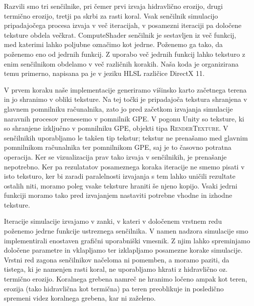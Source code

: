 \documentclass[9pt]{pnas-new}
\begin{document}
Razvili smo tri senčilnike, pri čemer prvi izvaja hidravlično erozijo, drugi termično erozijo, tretji pa skrbi za rasti koral. Vsak senčilnik simulacijo pripadajočega procesa izvaja v več iteracijah, v posamezni iteraciji pa določene teksture obdela večkrat. ComputeShader senčilnik je sestavljen iz več funkcij, med katerimi lahko poljubne označimo kot jedrne. Poženemo ga tako, da poženemo eno od jedrnih funkcij. Z uporabo več jedrnih funkcij lahko teksturo z enim senčilnikom obdelamo v več različnih korakih. Naša koda je organizirana temu primerno, napisana pa je v jeziku HLSL različice DirectX 11.

V prvem koraku naše implementacije generiramo višinsko karto začetnega terena in jo shranimo v obliki teksture. Na tej točki je pripadajoča tekstura shranjena v glavnem pomnilniku računalnika, zato jo pred začetkom izvajanja simulacije naravnih procesov prenesemo v pomnilnik GPE. V pogonu Unity so teksture, ki so shranjene izključno v pomnilniku GPE, objekti tipa \textsc{RenderTexture}. V senčilnikih uporabljamo le takšen tip tekstur; tekstur ne prenašamo med glavnim pomnilnikom računalnika ter pomnilnikom GPE, saj je to časovno potratna operacija. Ker se vizualizacija prav tako izvaja v senčilnikih, je prenašanje nepotrebno. Ker pa rezulatatov posameznega koraka iteracije ne smemo pisati v isto teksturo, ker bi zaradi paralelnosti izvajanja s tem lahko uničili rezultate ostalih niti, moramo poleg vsake teksture hraniti še njeno kopijo. Vsaki jedrni funkciji moramo tako pred izvajanjem nastaviti potrebne vhodne in izhodne teksture.

Iteracije simulacije izvajamo v zanki, v kateri v določenem vrstnem redu poženemo jedrne funkcije ustreznega senčilnika. V namen nadzora simulacije smo implementirali enostaven grafični uporabniški vmesnik. Z njim lahko spreminjamo določene parametre in vklapljamo ter izklapljamo posamezne korake simulacije. Vrstni red zagona senčilnikov načeloma ni pomemben, a moramo paziti, da tistega, ki je namenjen rasti koral, ne uporabljamo hkrati z hidravlično oz. termično erozijo. Koralnega grebena namreč ne hranimo ločeno ampak kot teren, erozija (tako hidravlična kot termična) pa teren preoblikuje in posledično spremeni videz koralnega grebena, kar ni zaželeno. %
\end{document}
